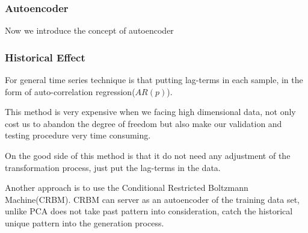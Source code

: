 \subsubsection{Autoencoder}
Now we introduce the concept of autoencoder

\subsubsection{Historical Effect}

    For general time series technique is that putting lag-terms in each sample, in the form of auto-correlation regression($AR(p)$).
    
    This method is very expensive when we facing high dimensional data, not only cost us to abandon the degree of freedom but also make our validation and testing procedure very time consuming.
    
    On the good side of this method is that it do not need any adjustment of the transformation process, just put the lag-terms in the data.
    
    Another approach is to use the Conditional Restricted Boltzmann Machine(CRBM). CRBM can server as an autoencoder of the training data set, unlike PCA does not take past pattern into consideration, catch the historical unique pattern into the generation process.